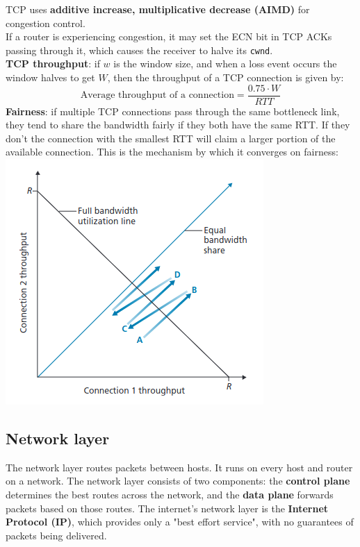 TCP uses \textbf{additive increase, multiplicative decrease (AIMD)} for congestion control.\\
If a router is experiencing congestion, it may set the ECN bit in TCP ACKs passing through it, which causes the receiver to halve its \verb|cwnd|.\\
\textbf{TCP throughput}: if $w$ is the window size, and when a loss event occurs the window halves to get $W$, then the throughput of a TCP connection is given by:
$$
	\text{Average throughput of a connection}=\frac{0.75\cdot W}{RTT}
$$
\textbf{Fairness}: if multiple TCP connections pass through the same bottleneck link, they tend to share the bandwidth fairly if they both have the same RTT. If they don't the connection with the smallest RTT will claim a larger portion of the available connection. This is the mechanism by which it converges on fairness:
\includegraphics[width=\linewidth]{../images/w5n4tcpFairness.png}\\

\subsection{Network layer}
The network layer routes packets between hosts. It runs on every host and router on a network. The network layer consists of two components: the \textbf{control plane} determines the best routes across the network, and the \textbf{data plane} forwards packets based on those routes. The internet's network layer is the \textbf{Internet Protocol (IP)}, which provides only a "best effort service", with no guarantees of packets being delivered.\\

